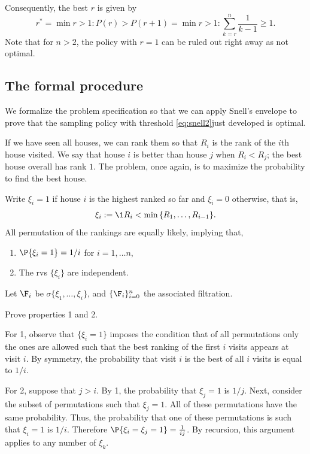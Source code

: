 \documentclass[a4paper]{article}
\begin{document}
Consequently, the best \(r\) is given by
\begin{equation}
\label{eq:snell2}
r^{*} = \min{r > 1: P(r) > P(r+1) } = \min {r>1 :  \sum_{k=r}^n \frac{1}{k-1} \geq 1}.
\end{equation}
Note that for \(n > 2\), the policy with \(r=1\) can be ruled out right away as not optimal.
\subsection{The formal procedure}
\label{sec:org02420fd}

We formalize the problem specification so that we can apply Snell's envelope to prove that the sampling policy with threshold \cref{eq:snell2}just developed is optimal.

If we have seen all houses, we can rank them so that \(R_i\) is the rank of the \(i\)th house visited.
We say that house \(i\) is better than house \(j\) when \(R_i < R_j\); the best house overall has rank \(1\).
The problem, once again, is to maximize the probability to find the best house.

Write \(\xi_i = 1\) if house \(i\) is the highest ranked so far and \(\xi_i=0\) otherwise, that is,
\begin{align*}
\xi_i := \1{R_i < \min{R_{1}, \ldots, R_{i-1}}}.
\end{align*}
All permutation of the rankings are equally likely, implying that,
\begin{enumerate}
\item \(\P{\xi_i = 1} = 1/i\) for \(i=1, \ldots n\),
\item The rvs \(\{\xi_i\}\) are independent.
\end{enumerate}
Let \(\F_{i}\) be  \(\sigma\{\xi_1, \ldots, \xi_i\}\), and \(\{\F_{i}\}_{i=0}^{n}\) the associated filtration.

\begin{exercise}
Prove properties 1 and 2.
\begin{solution}
For 1, observe that \(\{\xi_i=1\}\) imposes the condition that of all permutations only the ones are allowed such  that the best ranking of the first \(i\) visits appears at visit \(i\). By symmetry, the probability that visit \(i\) is the best of all \(i\) visits is equal to \(1/i\).

For 2, suppose that \(j>i\).
By 1, the probability that \(\xi_j = 1\) is \(1/j\).
Next, consider the subset of permutations such that \(\xi_j=1\).
All of these permutations have the same probability.
Thus, the probability that one of these permutations is such that \(\xi_i=1\) is \(1/i\).
Therefore \(\P{\xi_i=\xi_j=1} = \frac{1}{ij}\).
By recursion, this argument applies to any number of \(\xi_k\).
\end{solution}
\end{exercise}
\end{document}
